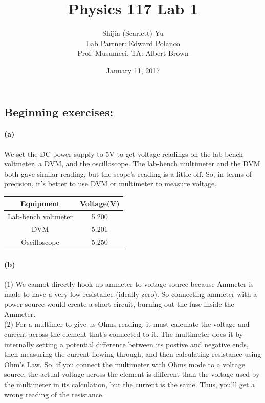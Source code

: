 \documentclass[]{article}
\title{Physics 117 Lab 1}
\author{Shijia (Scarlett) Yu \\Lab Partner: Edward Polanco\\Prof. Musumeci, TA: Albert Brown}
\date{January 11, 2017}
\begin{document}
	\maketitle
\subsection* {Beginning exercises:}
	\paragraph { (a)} %
		We set the DC power supply to 5V to get voltage readings on the lab-bench voltmeter, a DVM, and the oscilloscope. The lab-bench multimeter and the DVM both gave similar reading, but the scope's reading is a little off. So, in terms of precision, it's better to use DVM or multimeter to measure voltage.
			\begin{center}
			\begin{tabular}{|c|c|}
				\hline
				Equipment & Voltage(V) \\
				\hline
				Lab-bench voltmeter & 5.200\\
				\hline
				DVM &  5.201\\ 
				\hline
				Oscilloscope & 5.250 \\
				\hline
			\end{tabular}
		\end{center}
	\paragraph{ (b)} 
		(1) We cannot directly hook up ammeter to voltage source because Ammeter is made to have a very low resistance (ideally zero). So connecting ammeter with a power source would create a short circuit, burning out the fuse inside the Ammeter. \\
		(2) For a multimer to give us Ohms reading, it must calculate the voltage and current across the element that's connected to it. The multimeter does it by internally setting a potential difference between its postive and negative ends, then measuring the current flowing through, and then calculating resistance using Ohm's Law. So, if you connect the multimeter with Ohms mode to a voltage source, the actual voltage across the element is different than the voltage used by the multimeter in its calculation, but the current is the same. Thus, you'll get a wrong reading of the resistance.
		
\end{document}
